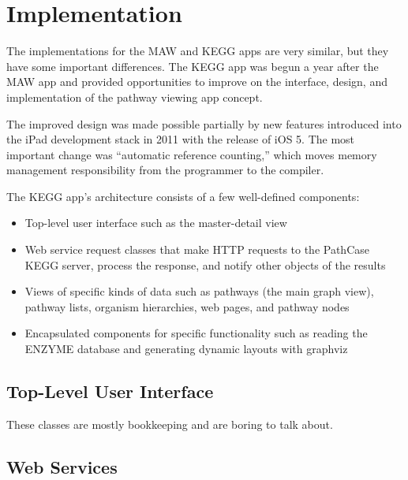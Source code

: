 \section{Implementation}
\label{sect:kegg_implementation}

The implementations for the MAW and KEGG apps are very similar, but they have
some important differences. The KEGG app was begun a year after the MAW app and
provided opportunities to improve on the interface, design, and implementation
of the pathway viewing app concept.

The improved design was made possible partially by new features introduced into
the iPad development stack in 2011 with the release of iOS 5. The most important
change was ``automatic reference counting,'' which moves memory management
responsibility from the programmer to the compiler. 

The KEGG app's architecture consists of a few well-defined components:

\begin{itemize}

    \item Top-level user interface such as the master-detail view
    
    \item Web service request classes that make HTTP requests to the PathCase
        KEGG server, process the response, and notify other objects of the
        results

    \item Views of specific kinds of data such as pathways (the main graph
        view), pathway lists, organism hierarchies, web pages, and pathway nodes

    \item Encapsulated components for specific functionality such as reading the
        ENZYME database and generating dynamic layouts with graphviz

\end{itemize}

\subsection{Top-Level User Interface}
\label{sect:kegg_impl_top_level_ui}

These classes are mostly bookkeeping and are boring to talk about.

\subsection{Web Services}
\label{sect:kegg_impl_web_services}

